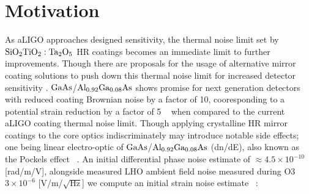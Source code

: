 


\section{Motivation}
As aLIGO approaches designed sensitivity, the thermal noise limit set by $\mathrm{SiO_2}\mathrm{TiO_2:Ta_2O_5}$ HR coatings becomes an immediate limit to further improvements. Though there are proposals for the usage of alternative mirror coating solutions to push down this thermal noise limit for increased detector sensitivity \cite{harry:aigwd2019}. $\mathrm{GaAs}$/$\mathrm{Al_{0.92}Ga_{0.08}As}$ shows promise for next generation detectors with reduced coating Brownian noise by a factor of 10, cooresponding to a potential strain reduction by a factor of 5 ~\cite{cole:2013} when compared to the current aLIGO coating thermal noise limit. Though applying crystalline HR mirror coatings to the core optics indiscriminately may introduce notable side effects; one being linear electro-optic of $\mathrm{GaAs}$/$\mathrm{Al_{0.92}Ga_{0.08}As}$ (dn/dE), also known as the Pockels effect ~\cite{abernathy:poster}. An initial differential phase noise estimate of $\approx 4.5\times 10^{-10}$ [rad/m/V], alongside measured LHO ambient field noise measured during O3 $3\times 10^{-6}$ [V/m/$\sqrt{\mathrm{Hz}}$] we compute an initial strain noise estimate ~\cite{fejer_estimate, buikema:2020}:


